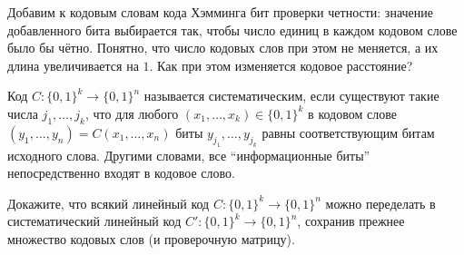 \begin{ptask}{53}
	Добавим к кодовым словам кода Хэмминга бит проверки четности: значение
	добавленного бита выбирается так, чтобы число единиц в каждом кодовом слове было
    бы чётно. Понятно, что число кодовых слов при этом не меняется, а их длина
    увеличивается на $1$. Как при этом изменяется кодовое расстояние?
\end{ptask}

\begin{ptask}{54}
    Код $C: \{0, 1\}^k \rightarrow \{0, 1\}^n$ называется систематическим, если
    существуют такие числа $j_1, \dots, j_k$, что для любого $(x_1, \dots, x_k) \in
    \{0, 1\}^k$ в кодовом слове $(y_1, \dots, y_n) = C(x_1, \dots, x_n)$ биты
    $y_{j_1}, \dots, y_{j_k}$ равны соответствующим битам исходного слова. Другими
    словами, все ``информационные биты'' непосредственно входят в кодовое слово.

    Докажите, что всякий линейный код $C: \{0, 1\}^k \rightarrow \{0, 1\}^n$ можно
    переделать в систематический линейный код $C': \{0, 1\}^k \rightarrow \{0,
    1\}^n$, сохранив прежнее множество кодовых слов (и проверочную матрицу).
\end{ptask}